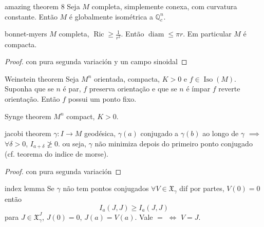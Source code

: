 \begin{thing6}{amazing theorem 8}\leavevmode
Seja \(M\) completa, simplemente conexa, com curvatura constante. Então \(M\) é globalmente isométrica a \(\mathbb{Q}^n_c\).
\end{thing6}

\begin{thing6}{bonnet-myers}\leavevmode
	\(M\) completa, \(\operatorname{Ric} \geq \frac{1}{r^2}\). Então \(\operatorname{diam}\leq \pi r\). Em particular \(M\) é compacta.
\end{thing6}
\begin{proof}\leavevmode
con pura segunda variación y un campo sinoidal
\end{proof}

\begin{thing6}{Weinstein theorem}\label{thm:Weinstein theorem}\leavevmode
Seja \(M^n\) orientada, compacta, \(K>0\) e \(f \in \operatorname{Iso}(M)\).  Suponha que se \(n\) é par, \(f\) preserva orientação e que se \(n\) é ímpar \(f\) reverte orientação. Então \(f\) possui um ponto fixo.
\end{thing6}

\begin{thing6}{Synge theorem}\leavevmode
\(M^n\) compact, \(K>0\).
\end{thing6}

\begin{thing6}{jacobi theorem}\leavevmode
\(\gamma:I \to M\) geodésica, \(\gamma(a)\) conjugado a \(\gamma(b)\) ao longo de \(\gamma\) \(\implies\) \(\forall \delta>0\), \(I_{a+\delta}\not \geq 0\). ou seja, \(\gamma\) não minimiza depois do primeiro ponto conjugado (cf. teorema do indice de morse).
\end{thing6}
\begin{proof}\leavevmode
con pura segunda variación
\end{proof}

\begin{thing6}{index lemma}\leavevmode
Se \(\gamma\) não tem pontos conjugados \(\forall V \in \mathfrak{X}_\gamma\) dif por partes, \(V(0)=0\) então
	\[\boxed{I_a(J,J) \geq I_a(J,J)}\]
para \(J \in \mathfrak{X}^J_\gamma\), \(J(0)=0\), \(J(a)=V(a)\). Vale \(=\) \(\iff\) \(V=J\).
\end{thing6}

